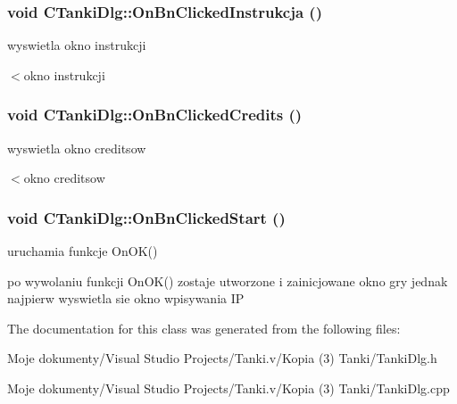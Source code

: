 \subsubsection{\setlength{\rightskip}{0pt plus 5cm}void CTankiDlg::OnBnClickedInstrukcja ()}\label{class_c_tanki_dlg_1330be343b5adf4d7b590f798eb5f3ff}


wyswietla okno instrukcji 



$<$okno instrukcji 
\subsubsection{\setlength{\rightskip}{0pt plus 5cm}void CTankiDlg::OnBnClickedCredits ()}\label{class_c_tanki_dlg_fdf015e6cf89d0e9229f23dc054581fe}


wyswietla okno creditsow 



$<$okno creditsow 
\subsubsection{\setlength{\rightskip}{0pt plus 5cm}void CTankiDlg::OnBnClickedStart ()}\label{class_c_tanki_dlg_962ccbb1211afa0fd71d31238989daef}


uruchamia funkcje OnOK() 

po wywolaniu funkcji OnOK() zostaje utworzone i zainicjowane okno gry jednak najpierw wyswietla sie okno wpisywania IP 

The documentation for this class was generated from the following files:\begin{CompactItemize}
\item 
Moje dokumenty/Visual Studio Projects/Tanki.v/Kopia (3) Tanki/TankiDlg.h\item 
Moje dokumenty/Visual Studio Projects/Tanki.v/Kopia (3) Tanki/TankiDlg.cpp\end{CompactItemize}
